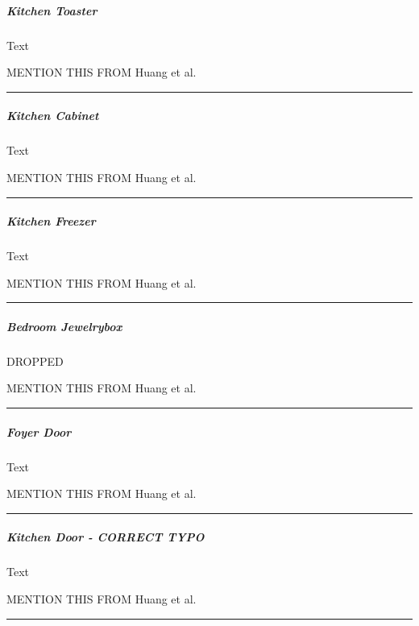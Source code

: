 \documentclass[11pt]{article}
\begin{document}
    \hypertarget{kitchen-toaster}{%
\subparagraph{Kitchen Toaster}\label{kitchen-toaster}}

    Text

    MENTION THIS FROM Huang et al.~

\begin{center}\rule{0.5\linewidth}{\linethickness}\end{center}

    \hypertarget{kitchen-cabinet}{%
\subparagraph{Kitchen Cabinet}\label{kitchen-cabinet}}

    Text

    MENTION THIS FROM Huang et al.~

\begin{center}\rule{0.5\linewidth}{\linethickness}\end{center}

    \hypertarget{kitchen-freezer}{%
\subparagraph{Kitchen Freezer}\label{kitchen-freezer}}

    Text

    MENTION THIS FROM Huang et al.~

\begin{center}\rule{0.5\linewidth}{\linethickness}\end{center}

    \hypertarget{bedroom-jewelrybox}{%
\subparagraph{Bedroom Jewelrybox}\label{bedroom-jewelrybox}}

    DROPPED

    MENTION THIS FROM Huang et al.~

\begin{center}\rule{0.5\linewidth}{\linethickness}\end{center}

    \hypertarget{foyer-door}{%
\subparagraph{Foyer Door}\label{foyer-door}}

    Text

    MENTION THIS FROM Huang et al.~

\begin{center}\rule{0.5\linewidth}{\linethickness}\end{center}

    \hypertarget{kitchen-door---correct-typo}{%
\subparagraph{Kitchen Door - CORRECT
TYPO}\label{kitchen-door---correct-typo}}

    Text

    MENTION THIS FROM Huang et al.~

\begin{center}\rule{0.5\linewidth}{\linethickness}\end{center}
\end{document}
